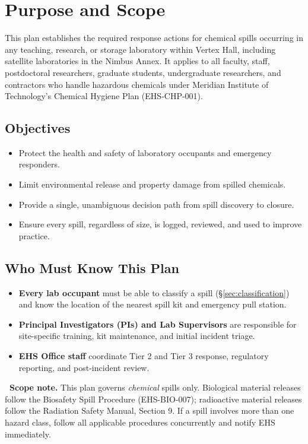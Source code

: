 
\section{Purpose and Scope}

This plan establishes the required response actions for chemical spills occurring in any
teaching, research, or storage laboratory within Vertex Hall, including satellite laboratories
in the Nimbus Annex. It applies to all faculty, staff, postdoctoral researchers, graduate
students, undergraduate researchers, and contractors who handle hazardous chemicals under
Meridian Institute of Technology's Chemical Hygiene Plan (EHS-CHP-001).

\subsection*{Objectives}
\begin{itemize}
  \item Protect the health and safety of laboratory occupants and emergency responders.
  \item Limit environmental release and property damage from spilled chemicals.
  \item Provide a single, unambiguous decision path from spill discovery to closure.
  \item Ensure every spill, regardless of size, is logged, reviewed, and used to improve
        practice.
\end{itemize}

\subsection*{Who Must Know This Plan}
\begin{itemize}
  \item \textbf{Every lab occupant} must be able to classify a spill (\S\ref{sec:classification})
        and know the location of the nearest spill kit and emergency pull station.
  \item \textbf{Principal Investigators (PIs) and Lab Supervisors} are responsible for
        site-specific training, kit maintenance, and initial incident triage.
  \item \textbf{EHS Office staff} coordinate Tier 2 and Tier 3 response, regulatory reporting,
        and post-incident review.
\end{itemize}

\begin{notebox}
\textbf{\hazicon{\faInfoCircle}\ Scope note.} This plan governs \emph{chemical} spills only.
Biological material releases follow the Biosafety Spill Procedure (EHS-BIO-007); radioactive
material releases follow the Radiation Safety Manual, Section 9. If a spill involves more than
one hazard class, follow all applicable procedures concurrently and notify EHS immediately.
\end{notebox}
